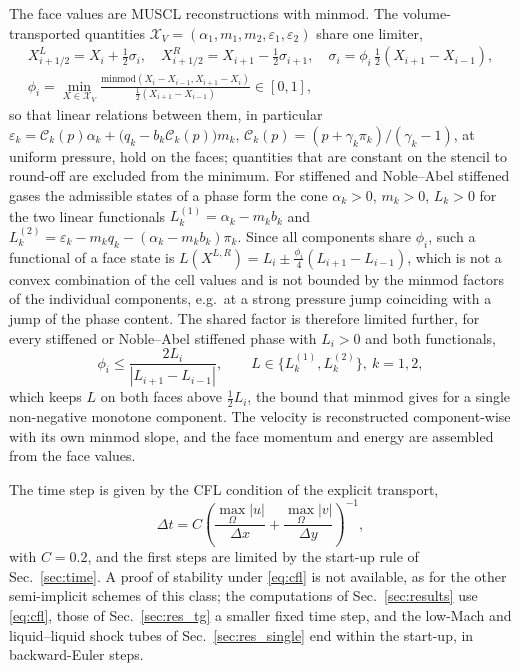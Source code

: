 The face values are MUSCL reconstructions \cite{vanLeer1979} with minmod. The volume-transported quantities
$\mathcal X_V=(\alpha_1,m_1,m_2,\varepsilon_1,\varepsilon_2)$ share one limiter,
\begin{equation}
\begin{gathered}
X^L_{i+1/2}=X_i+\tfrac12\sigma_i,\quad X^R_{i+1/2}=X_{i+1}-\tfrac12\sigma_{i+1},\quad \sigma_i=\phi_i\,\tfrac12(X_{i+1}-X_{i-1}),\\
\phi_i=\min_{X\in\mathcal X_V}\frac{\mathrm{minmod}(X_i-X_{i-1},X_{i+1}-X_i)}{\tfrac12(X_{i+1}-X_{i-1})}\in[0,1],
\end{gathered}
\label{eq:shared_limiter}
\end{equation}
so that linear relations between them, in particular $\varepsilon_k=\mathcal C_k(p)\alpha_k+\big(q_k-b_k\mathcal C_k(p)\big)m_k$, $\mathcal C_k(p)=(p+\gamma_k\pi_k)/(\gamma_k-1)$, at
uniform pressure, hold on the faces; quantities that are constant on the stencil to round-off are excluded from the minimum.
For stiffened and Noble--Abel stiffened gases the admissible states of a phase form the cone $\alpha_k>0$, $m_k>0$, $L_k>0$ for the
two linear functionals $L^{(1)}_k=\alpha_k-m_kb_k$ and $L^{(2)}_k=\varepsilon_k-m_kq_k-(\alpha_k-m_kb_k)\pi_k$. Since all components share $\phi_i$, such a
functional of a face state is $L(X^{L,R})=L_i\pm\tfrac{\phi_i}4(L_{i+1}-L_{i-1})$, which is not a convex combination of the cell values and is not
bounded by the minmod factors of the individual components, e.g.\ at a strong pressure jump coinciding with a jump of
the phase content. The shared factor is therefore limited further, for every stiffened or Noble--Abel stiffened phase with $L_i>0$ and both
functionals,
\begin{equation}
\phi_i\le\frac{2L_i}{|L_{i+1}-L_{i-1}|},\qquad L\in\{L^{(1)}_k,L^{(2)}_k\},\ k=1,2 ,
\label{eq:phi_cap}
\end{equation}
which keeps $L$ on both faces above $\tfrac12L_i$, the bound that minmod gives for a single non-negative monotone component. The velocity is reconstructed component-wise with its own minmod slope, and the face
momentum and energy are assembled from the face values.

The time step is given by the CFL condition of the explicit transport,
\begin{equation}
\Delta t=C\left(\frac{\max_\Omega|u|}{\Delta x}+\frac{\max_\Omega|v|}{\Delta y}\right)^{-1},
\label{eq:cfl}
\end{equation}
with $C=0.2$, and the first steps are limited by the
start-up rule of Sec.~\ref{sec:time}. A proof of stability under \eqref{eq:cfl} is not available, as for the
other semi-implicit schemes of this class; the computations of Sec.~\ref{sec:results} use \eqref{eq:cfl}, those of
Sec.~\ref{sec:res_tg} a smaller fixed time step, and the low-Mach and liquid--liquid shock tubes of Sec.~\ref{sec:res_single}
end within the start-up, in backward-Euler steps.

